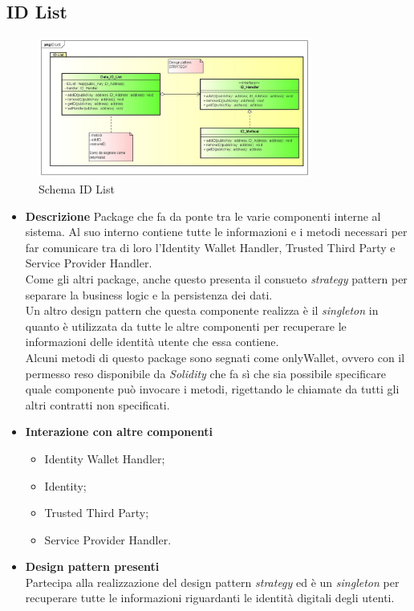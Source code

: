 \subsection{ID List}
\begin{figure}[!h]
	\centering
	\includegraphics[width=0.8\textwidth]{immagini/idList}
	\caption{Schema ID List}
\end{figure}
\begin{itemize}
	\item \textbf{Descrizione}
	Package che fa da ponte tra le varie componenti interne al sistema. 
	Al suo interno contiene tutte le informazioni e i metodi necessari per far comunicare tra di loro l'Identity Wallet Handler, Trusted Third Party e Service Provider Handler.\\
	Come gli altri package, anche questo presenta il consueto \textit{strategy} pattern per separare la business logic e la persistenza dei dati.\\
	Un altro design pattern che questa componente realizza è il \textit{singleton} in quanto è utilizzata da tutte le altre componenti per recuperare le informazioni delle identità utente che essa contiene.\\
	Alcuni metodi di questo package sono segnati come onlyWallet, ovvero con il permesso reso disponibile da \textit{Solidity} che fa sì che sia possibile specificare quale componente può invocare i metodi, rigettando le chiamate da tutti gli altri contratti non specificati.
	\item \textbf{Interazione con altre componenti}
	\begin{itemize}
		\item Identity Wallet Handler;
		\item Identity;
		\item Trusted Third Party;
		\item Service Provider Handler.
	\end{itemize}
	\item \textbf{Design pattern presenti}\\
	Partecipa alla realizzazione del design pattern \textit{strategy} ed è un \textit{singleton} per recuperare tutte le informazioni riguardanti le identità digitali degli utenti.
\end{itemize}
